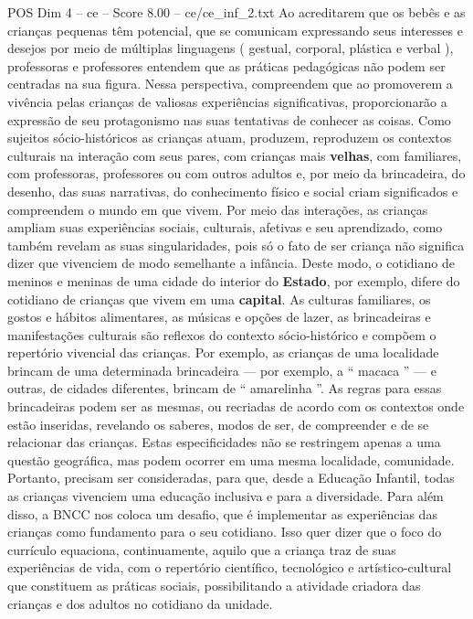 \begin{textsample}{POS Dim 4 – ce – Score 8.00 – ce/ce\_inf\_2.txt}
Ao acreditarem que os bebês e as crianças pequenas têm potencial, que se comunicam expressando seus interesses e desejos por meio de múltiplas linguagens ( gestual, corporal, plástica e verbal ), professoras e professores entendem que as práticas pedagógicas não podem ser centradas na sua figura.
Nessa perspectiva, compreendem que ao promoverem a vivência pelas crianças de valiosas experiências significativas, proporcionarão a expressão de seu protagonismo nas suas tentativas de conhecer as coisas.
Como sujeitos sócio-históricos as crianças atuam, produzem, reproduzem os contextos culturais na interação com seus pares, com crianças mais \textbf{velhas}, com familiares, com professoras, professores ou com outros adultos e, por meio da brincadeira, do desenho, das suas narrativas, do conhecimento físico e social criam significados e compreendem o mundo em que vivem.
Por meio das interações, as crianças ampliam suas experiências sociais, culturais, afetivas e seu aprendizado, como também revelam as suas singularidades, pois só o fato de ser criança não significa dizer que vivenciem de modo semelhante a infância.
Deste modo, o cotidiano de meninos e meninas de uma cidade do interior do \textbf{Estado}, por exemplo, difere do cotidiano de crianças que vivem em uma \textbf{capital}.
As culturas familiares, os gostos e hábitos alimentares, as músicas e opções de lazer, as brincadeiras e manifestações culturais são reflexos do contexto sócio-histórico e compõem o repertório vivencial das crianças.
Por exemplo, as crianças de uma localidade brincam de uma determinada brincadeira — por exemplo, a “ macaca ” — e outras, de cidades diferentes, brincam de “ amarelinha ”.
As regras para essas brincadeiras podem ser as mesmas, ou recriadas de acordo com os contextos onde estão inseridas, revelando os saberes, modos de ser, de compreender e de se relacionar das crianças.
Estas especificidades não se restringem apenas a uma questão geográfica, mas podem ocorrer em uma mesma localidade, comunidade.
Portanto, precisam ser consideradas, para que, desde a Educação Infantil, todas as crianças vivenciem uma educação inclusiva e para a diversidade.
Para além disso, a BNCC nos coloca um desafio, que é implementar as experiências das crianças como fundamento para o seu cotidiano.
Isso quer dizer que o foco do currículo equaciona, continuamente, aquilo que a criança traz de suas experiências de vida, com o repertório científico, tecnológico e artístico-cultural que constituem as práticas sociais, possibilitando a atividade criadora das crianças e dos adultos no cotidiano da unidade.

\end{textsample}
